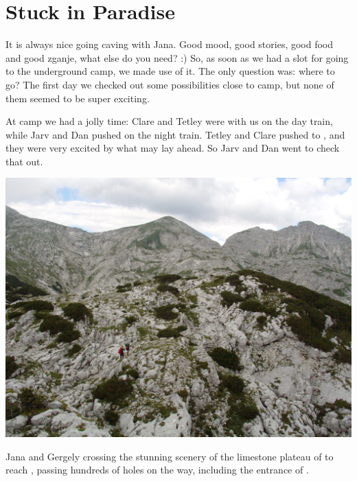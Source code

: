 \section{Stuck in Paradise}



It is always nice going caving with Jana. Good mood, good stories, good
food and good zganje, what else do you need? :) So, as soon as we had a
slot for going to the underground camp, we made use of it. The only
question was: where to go? The first day we checked out some
possibilities close to camp, but none of them seemed to be super
exciting.

At camp we had a jolly time: Clare and Tetley were with us on the day
train, while Jarv and Dan pushed on the night train. Tetley and Clare
pushed  to , and they were very
excited by what may lay ahead. So Jarv and Dan went to check that out.


\begin{pagefigure}
\checkoddpage \ifoddpage \forcerectofloat \else \forceversofloat \fi
   \centering
\includegraphics[width = \textwidth]{2011/stuck_in_paradise/2011-07-29-12.19.20-Jarvist Frost-CanonG5-CRW_0118 - Jana and Gergely off to underground camp heading towards M2--orig.jpg}
\caption{Jana and Gergely crossing the stunning scenery of the limestone plateau of  to reach , passing hundreds of holes on the way, including the entrance of . } \label{jana gergely cross plateau}
\end{pagefigure}

